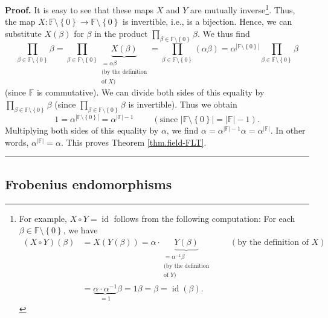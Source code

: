 \documentclass[numbers=enddot,12pt,final,onecolumn,notitlepage]{scrartcl}%
\theoremstyle{definition}
\newenvironment{proof}[1][Proof]{\noindent\textbf{#1.} }{\ \rule{0.5em}{0.5em}}
\let\prodnonlimits\prod
\renewcommand{\prod}{\prodnonlimits\limits}
\begin{document}
\begin{proof}
It is easy to see that these maps $X$ and $Y$ are mutually
inverse\footnote{For example, $X\circ Y=\operatorname*{id}$ follows from the
following computation: For each $\beta\in\mathbb{F}\setminus\left\{
0\right\}  $, we have%
\begin{align*}
\left(  X\circ Y\right)  \left(  \beta\right)   &  =X\left(  Y\left(
\beta\right)  \right)  =\alpha\cdot\underbrace{Y\left(  \beta\right)
}_{\substack{=\alpha^{-1}\beta\\\text{(by the definition}\\\text{of }%
Y\text{)}}}\ \ \ \ \ \ \ \ \ \ \left(  \text{by the definition of }X\right)
\\
&  =\underbrace{\alpha\cdot\alpha^{-1}}_{=1}\beta=1\beta=\beta
=\operatorname*{id}\left(  \beta\right)  .
\end{align*}
}. Thus, the map $X:\mathbb{F}\setminus\left\{  0\right\}  \rightarrow
\mathbb{F}\setminus\left\{  0\right\}  $ is invertible, i.e., is a bijection.
Hence, we can substitute $X\left(  \beta\right)  $ for $\beta$ in the product
$\prod_{\beta\in\mathbb{F}\setminus\left\{  0\right\}  }\beta$. We thus find%
\[
\prod_{\beta\in\mathbb{F}\setminus\left\{  0\right\}  }\beta=\prod_{\beta
\in\mathbb{F}\setminus\left\{  0\right\}  }\underbrace{X\left(  \beta\right)
}_{\substack{=\alpha\beta\\\text{(by the definition}\\\text{of }X\text{)}%
}}=\prod_{\beta\in\mathbb{F}\setminus\left\{  0\right\}  }\left(  \alpha
\beta\right)  =\alpha^{\left\vert \mathbb{F}\setminus\left\{  0\right\}
\right\vert }\prod_{\beta\in\mathbb{F}\setminus\left\{  0\right\}  }\beta
\]
(since $\mathbb{F}$ is commutative). We can divide both sides of this equality
by $\prod_{\beta\in\mathbb{F}\setminus\left\{  0\right\}  }\beta$ (since
$\prod_{\beta\in\mathbb{F}\setminus\left\{  0\right\}  }\beta$ is invertible).
Thus we obtain%
\[
1=\alpha^{\left\vert \mathbb{F}\setminus\left\{  0\right\}  \right\vert
}=\alpha^{\left\vert \mathbb{F}\right\vert -1}\ \ \ \ \ \ \ \ \ \ \left(
\text{since }\left\vert \mathbb{F}\setminus\left\{  0\right\}  \right\vert
=\left\vert \mathbb{F}\right\vert -1\right)  .
\]
Multiplying both sides of this equality by $\alpha$, we find $\alpha
=\alpha^{\left\vert \mathbb{F}\right\vert -1}\alpha=\alpha^{\left\vert
\mathbb{F}\right\vert }$. In other words, $\alpha^{\left\vert \mathbb{F}%
\right\vert }=\alpha$. This proves Theorem \ref{thm.field-FLT}.
\end{proof}

\subsection{Frobenius endomorphisms}
\end{document}
